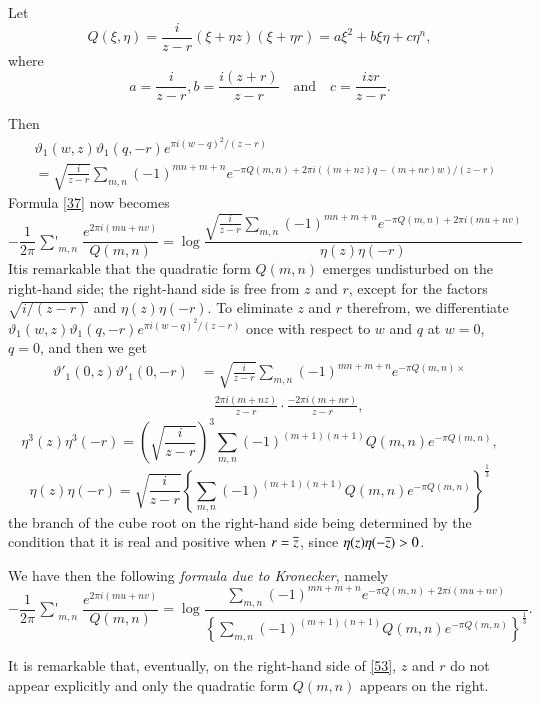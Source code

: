 Let
$$
Q(\xi,\eta)=\frac{i}{z-r}(\xi+\eta z)(\xi+\eta
r)=a\xi^{2}+b\xi\eta+c\eta^{n},
$$
where
$$
a=\frac{i}{z-r},b=\frac{i(z+r)}{z-r}\quad\text{and}\quad
c=\frac{izr}{z-r}.
$$

Then 
\begin{align*}
& \vartheta_{1}(w,z)\vartheta_{1}(q,-r)e^{\pi i(w-q)^{2}/(z-r)}\\
&=\sqrt{\frac{i}{z-r}}\sum_{m,n}(-1)^{mn+m+n}e^{-\pi Q(m,n)+2\pi
    i((m+nz)q-(m+nr)w)/(z-r)}  
\end{align*}
Formula \eqref{37} now becomes
$$
-\frac{1}{2\pi}\mathop{{\sum}'}_{m,n}\frac{e^{2\pi
    i(mu+nv)}}{Q(m,n)}=\log\frac{\sqrt{\frac{i}{z-r}}\sum_{m,n}(-1)^{mn+m+n}e^{-\pi
    Q(m,n)+2\pi i(mu+nv)}}{\eta(z)\eta(-r)} 
$$
It\pageoriginale is remarkable that the quadratic form $Q(m,n)$
emerges undisturbed on the right-hand side; the right-hand side is
free from $z$ and $r$, except for the factors $\sqrt{i/(z-r)}$ and
$\eta(z)\eta(-r)$. To eliminate $z$ and $r$ therefrom, we
differentiate $\vartheta_{1}(w,z)\vartheta_{1}(q,-r)e^{\pi
  i(w-q)^{2}/(z-r)}$ once with respect to $w$ and $q$ at $w=0$, $q=0$,
and then we get
\begin{align*}
\vartheta'_{1}(0,z)\vartheta'_{1}(0,-r) &=
\sqrt{\frac{i}{z-r}}\sum_{m,n}(-1)^{mn+m+n}e^{-\pi Q(m,n)\times}\\
&\quad \frac{2\pi i(m+nz)}{z-r}\cdot \frac{-2\pi i(m+nr)}{z-r},
\end{align*}
\ie
$$
\eta^{3}(z)\eta^{3}(-r)=\left(\sqrt{\frac{i}{z-r}}\right)^{3}\sum_{m,n}(-1)^{(m+1)(n+1)}Q(m,n)e^{-\pi
  Q(m,n)},
$$
\ie
$$
\eta(z)\eta(-r)=\sqrt{\frac{i}{z-r}}\left\{\sum_{m,n}(-1)^{(m+1)(n+1)}Q(m,n)e^{-\pi
  Q(m,n)}\right\}^{\frac{1}{3}} 
$$
the branch of the cube root on the right-hand side being determined by
the condition that it is real and positive when $r=\overline{z}$, since
$\eta(z)\eta(-\overline{z})>0$. 

We have then the following {\em formula due to Kronecker}, namely
\begin{equation*}
-\frac{1}{2\pi}\mathop{{\sum}'}_{m,n}\frac{e^{2\pi
    i(mu+nv)}}{Q(m,n)}=\log \frac{\sum_{m,n}(-1)^{mn+m+n}e^{-\pi
    Q(m,n)+2\pi
    i(mu+nv)}}{\left\{\sum_{m,n}(-1)^{(m+1)(n+1)}Q(m,n)e^{-\pi
    Q(m,n)}\right\}^{\frac{1}{3}}}.\tag{53}\label{53} 
\end{equation*}

It is remarkable that, eventually, on the right-hand side of
\eqref{53}, $z$ and $r$ do not appear explicitly and only the
quadratic form $Q(m,n)$ appears on the right.

